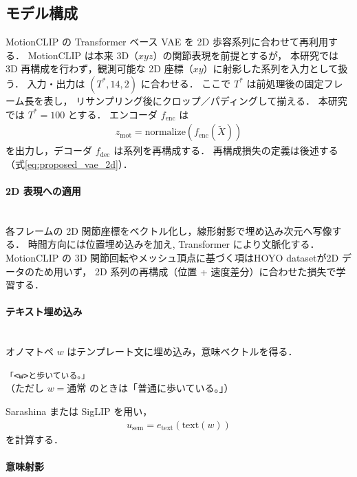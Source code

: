 \subsection{モデル構成}
\label{subsec:offline_model}

MotionCLIP \cite{MotionCLIP} の Transformer ベース VAE を 2D 歩容系列に合わせて再利用する．
MotionCLIP は本来 3D（$xyz$）の関節表現を前提とするが，
本研究では 3D 再構成を行わず，観測可能な 2D 座標（$xy$）に射影した系列を入力として扱う．
入力・出力は $(T^\ast, 14, 2)$ に合わせる．
ここで $T^\ast$ は前処理後の固定フレーム長を表し，
リサンプリング後にクロップ／パディングして揃える．
本研究では $T^\ast=100$ とする．
エンコーダ $f_{\mathrm{enc}}$ は
\begin{align}
  z_{\mathrm{mot}} = \mathrm{normalize}\left(f_{\mathrm{enc}}(\tilde{X})\right)
\end{align}
を出力し，デコーダ $f_{\mathrm{dec}}$ は系列を再構成する．
再構成損失の定義は後述する（式\ref{eq:proposed_vae_2d}）．

\paragraph{2D 表現への適用}\quad\\

各フレームの 2D 関節座標をベクトル化し，線形射影で埋め込み次元へ写像する．
時間方向には位置埋め込みを加え, Transformer により文脈化する．
MotionCLIP の 3D 関節回転やメッシュ頂点に基づく項はHOYO datasetが2D データのため用いず，
2D 系列の再構成（位置 + 速度差分）に合わせた損失で学習する．

\paragraph{テキスト埋め込み}\quad\\

オノマトペ $w$ はテンプレート文に埋め込み，意味ベクトルを得る．
\begin{center}
  \texttt{「<w>と歩いている。」}\\
  （ただし $w=\text{通常}$ のときは「普通に歩いている。」）
\end{center}
Sarashina \cite{sarashina} または SigLIP \cite{siglip} を用い，
\begin{align}
  u_{\mathrm{sem}} = e_{\mathrm{text}}(\mathrm{text}(w))
\end{align}
を計算する．


\paragraph{意味射影}\quad\\

